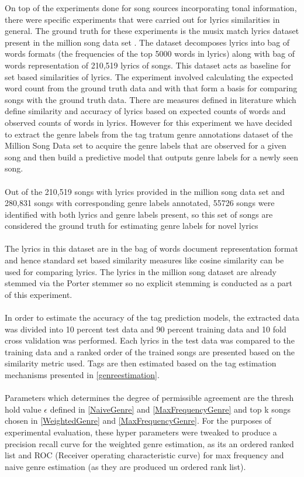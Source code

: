 \noindent On top of the experiments done for song sources incorporating tonal information, there were specific experiments that were carried out for lyrics similarities in general. The ground truth for these experiments is the musix match lyrics dataset present in the million song data set \cite{msd}. The dataset decomposes lyrics into bag of words formats (the frequencies of the top 5000 words in lyrics) along with bag of words representation of 210,519 lyrics of songs. This dataset acts as baseline for set based similarities of lyrics. The experiment involved calculating the expected word count from the ground truth data and with that form a basis for comparing songs with the ground truth data. There are measures defined in literature \cite{lyricsRanking} which define similarity and accuracy of lyrics based on expected counts of words and observed counts of words in lyrics. However for this experiment we have decided to extract the genre labels from the tag tratum genre annotations dataset of the Million Song Data set \cite{msd} to acquire the genre labels that are observed for a given song and then build a predictive model that outputs genre labels for a newly seen song. \\\\
Out of the 210,519 songs with lyrics provided in the million song data set and 280,831 songs with corresponding genre labels annotated, 55726 songs were identified with both lyrics and genre labels present, so this set of songs are considered the ground truth for estimating genre labels for novel lyrics \\\\ 
The lyrics in this dataset are in the bag of words document representation format and hence standard set based similarity measures like cosine similarity can be used for comparing lyrics. The lyrics in the million song dataset are already stemmed via the Porter stemmer \cite{msd} so no explicit stemming is conducted as a part of this experiment.\\\\
In order to estimate the accuracy of the tag prediction models, the extracted data was divided into 10 percent test data and 90 percent training data and 10 fold cross validation was performed. Each lyrics in the test data was compared to the training data and a ranked order of the trained songs are presented based on the similarity metric used. Tags are then estimated based on the tag estimation mechanisms presented in \ref{genreestimation}. \\\\
Parameters which determines the degree of permissible agreement are the thresh hold value $\epsilon$ defined in \ref{NaiveGenre} and \ref{MaxFrequencyGenre} and top k songs chosen in \ref{WeightedGenre} and \ref{MaxFrequencyGenre}. For the purposes of experimental evaluation, these hyper parameters were tweaked to produce a precision recall curve for the weighted genre estimation, as its an ordered ranked list and ROC (Receiver operating characteristic curve) for max frequency and naive genre estimation (as they are produced un ordered rank list). \\

